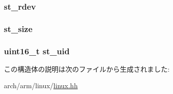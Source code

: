 \label{structArmLinux32_1_1tgt__stat_a57eca117f38b8e28cca30edc65cc6af8}
\hypertarget{structArmLinux32_1_1tgt__stat_ac4a67c3d290b4f93d0d91b99776f4207}{
\subsubsection[{st\_\-rdev}]{ {\bf st\_\-rdev}}}
\label{structArmLinux32_1_1tgt__stat_ac4a67c3d290b4f93d0d91b99776f4207}
\hypertarget{structArmLinux32_1_1tgt__stat_a0b83ab57b8d5de04bad49c03958fd7d7}{
\subsubsection[{st\_\-size}]{ {\bf st\_\-size}}}
\label{structArmLinux32_1_1tgt__stat_a0b83ab57b8d5de04bad49c03958fd7d7}
\hypertarget{structArmLinux32_1_1tgt__stat_a2fc914a09f2b0b59ef86f3fad7a66199}{
\subsubsection[{st\_\-uid}]{\setlength{\rightskip}{0pt plus 5cm}uint16\_\-t {\bf st\_\-uid}}}
\label{structArmLinux32_1_1tgt__stat_a2fc914a09f2b0b59ef86f3fad7a66199}


この構造体の説明は次のファイルから生成されました:\begin{DoxyCompactItemize}
\item 
arch/arm/linux/\hyperlink{arch_2arm_2linux_2linux_8hh}{linux.hh}\end{DoxyCompactItemize}
